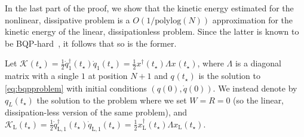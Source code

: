 \documentclass[superscriptaddress,onecolumn,nofootinbib,longbibliography,a4paper,accepted=2026-09-29]{quantumarticle}
\theoremstyle{plain}
\theoremstyle{definition}
\numberwithin{thm}{section}
\numberwithin{assumption}{section}
\numberwithin{lemma}{section}
\numberwithin{prop}{section}
\numberwithin{cor}{section}
\numberwithin{definition}{section}
\numberwithin{rmk}{section}
\numberwithin{equation}{section}
\begin{document}
In the last part of the proof, we show that the kinetic energy estimated for the nonlinear, dissipative problem is a $O(1/\mathrm{polylog}(N))$ approximation for the kinetic energy of the linear, dissipationless problem. Since the latter is known to be BQP-hard~\cite{babbush2023exponential}, it follows that so is the former.

Let $\mathcal{K}_{}(t_\star) = \frac{1}{2} \dot{q}_{1}^\dag(t_\star) \dot{q}_{1}(t_\star) =  \frac{1}{2}x_{}^\dag(t_\star) \Lambda x_{}(t_\star)$, where $\Lambda$ is a diagonal matrix with a single $1$ at position $N+1$ and $q_{}(t_\star)$ is the solution to \eqref{eq:bqpproblem} with initial conditions $(q(0), \dot{q}(0))$. We instead denote by $q_L(t_\star)$ the solution to the problem where we set $W=R=0$ (so the linear, dissipation-less version of the same problem),  and $\mathcal{K}_{\mathrm{L}}(t_\star) = \frac{1}{2} \dot{q}_{\mathrm{L},1}^\dag(t_\star) \dot{q}_{\mathrm{L},1}(t_\star) =  \frac{1}{2}x_{\mathrm{L}}^\dag(t_\star) \Lambda x_{\mathrm{L}}(t_\star)$. 
\end{document}
